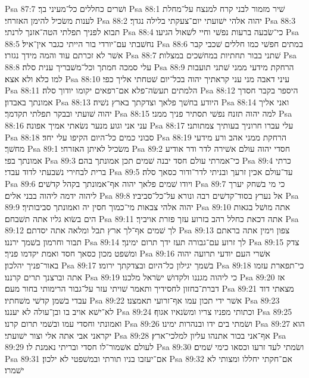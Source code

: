 Psa 87:7  ושׁרים כחללים כל־מעיני בך׃
Psa 88:1  שׁיר מזמור לבני קרח למנצח על־מחלת לענות משׂכיל להימן האזרחי׃
Psa 88:2  יהוה אלהי ישׁועתי יום־צעקתי בלילה נגדך׃
Psa 88:3  תבוא לפניך תפלתי הטה־אזנך לרנתי׃
Psa 88:4  כי־שׂבעה ברעות נפשׁי וחיי לשׁאול הגיעו׃
Psa 88:5  נחשׁבתי עם־יורדי בור הייתי כגבר אין־איל׃
Psa 88:6  במתים חפשׁי כמו חללים שׁכבי קבר אשׁר לא זכרתם עוד והמה מידך נגזרו׃
Psa 88:7  שׁתני בבור תחתיות במחשׁכים במצלות׃
Psa 88:8  עלי סמכה חמתך וכל־משׁבריך ענית סלה׃
Psa 88:9  הרחקת מידעי ממני שׁתני תועבות למו כלא ולא אצא׃
Psa 88:10  עיני דאבה מני עני קראתיך יהוה בכל־יום שׁטחתי אליך כפי׃
Psa 88:11  הלמתים תעשׂה־פלא אם־רפאים יקומו יודוך סלה׃
Psa 88:12  היספר בקבר חסדך אמונתך באבדון׃
Psa 88:13  היודע בחשׁך פלאך וצדקתך בארץ נשׁיה׃
Psa 88:14  ואני אליך יהוה שׁועתי ובבקר תפלתי תקדמך׃
Psa 88:15  למה יהוה תזנח נפשׁי תסתיר פניך ממני׃
Psa 88:16  עני אני וגוע מנער נשׂאתי אמיך אפונה׃
Psa 88:17  עלי עברו חרוניך בעותיך צמתותני׃
Psa 88:18  סבוני כמים כל־היום הקיפו עלי יחד׃
Psa 88:19  הרחקת ממני אהב ורע מידעי מחשׁך׃
Psa 89:1  משׂכיל לאיתן האזרחי׃
Psa 89:2  חסדי יהוה עולם אשׁירה לדר ודר אודיע אמונתך בפי׃
Psa 89:3  כי־אמרתי עולם חסד יבנה שׁמים תכן אמונתך בהם׃
Psa 89:4  כרתי ברית לבחירי נשׁבעתי לדוד עבדי׃
Psa 89:5  עד־עולם אכין זרעך ובניתי לדר־ודור כסאך סלה׃
Psa 89:6  ויודו שׁמים פלאך יהוה אף־אמונתך בקהל קדשׁים׃
Psa 89:7  כי מי בשׁחק יערך ליהוה ידמה ליהוה בבני אלים׃
Psa 89:8  אל נערץ בסוד־קדשׁים רבה ונורא על־כל־סביביו׃
Psa 89:9  יהוה אלהי צבאות מי־כמוך חסין יה ואמונתך סביבותיך׃
Psa 89:10  אתה מושׁל בגאות הים בשׂוא גליו אתה תשׁבחם׃
Psa 89:11  אתה דכאת כחלל רהב בזרוע עזך פזרת אויביך׃
Psa 89:12  לך שׁמים אף־לך ארץ תבל ומלאה אתה יסדתם׃
Psa 89:13  צפון וימין אתה בראתם תבור וחרמון בשׁמך ירננו׃
Psa 89:14  לך זרוע עם־גבורה תעז ידך תרום ימינך׃
Psa 89:15  צדק ומשׁפט מכון כסאך חסד ואמת יקדמו פניך׃
Psa 89:16  אשׁרי העם יודעי תרועה יהוה באור־פניך יהלכון׃
Psa 89:17  בשׁמך יגילון כל־היום ובצדקתך ירומו׃
Psa 89:18  כי־תפארת עזמו אתה וברצנך תרים קרננו׃
Psa 89:19  כי ליהוה מגננו ולקדושׁ ישׂראל מלכנו׃
Psa 89:20  אז דברת־בחזון לחסידיך ותאמר שׁויתי עזר על־גבור הרימותי בחור מעם׃
Psa 89:21  מצאתי דוד עבדי בשׁמן קדשׁי משׁחתיו׃
Psa 89:22  אשׁר ידי תכון עמו אף־זרועי תאמצנו׃
Psa 89:23  לא־ישׁא אויב בו ובן־עולה לא יעננו׃
Psa 89:24  וכתותי מפניו צריו ומשׂנאיו אגוף׃
Psa 89:25  ואמונתי וחסדי עמו ובשׁמי תרום קרנו׃
Psa 89:26  ושׂמתי בים ידו ובנהרות ימינו׃
Psa 89:27  הוא יקראני אבי אתה אלי וצור ישׁועתי׃
Psa 89:28  אף־אני בכור אתנהו עליון למלכי־ארץ׃
Psa 89:29  לעולם אשׁמור־לו חסדי ובריתי נאמנת לו׃
Psa 89:30  ושׂמתי לעד זרעו וכסאו כימי שׁמים׃
Psa 89:31  אם־יעזבו בניו תורתי ובמשׁפטי לא ילכון׃
Psa 89:32  אם־חקתי יחללו ומצותי לא ישׁמרו׃
